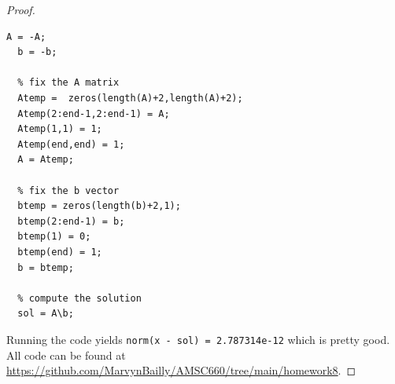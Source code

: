 \documentclass[12pt]{report}
\begin{document}
\begin{problem}
\begin{proof}
\begin{lstlisting}[style=Matlab-editor]
  A = -A;
  b = -b;

  % fix the A matrix
  Atemp =  zeros(length(A)+2,length(A)+2);
  Atemp(2:end-1,2:end-1) = A;
  Atemp(1,1) = 1;
  Atemp(end,end) = 1;
  A = Atemp;

  % fix the b vector
  btemp = zeros(length(b)+2,1);
  btemp(2:end-1) = b;
  btemp(1) = 0;
  btemp(end) = 1;
  b = btemp; 

  % compute the solution
  sol = A\b;
\end{lstlisting}
Running the code yields \verb+norm(x - sol) = 2.787314e-12+ which is pretty good. All code can be found at \url{https://github.com/MarvynBailly/AMSC660/tree/main/homework8}.

\end{proof}
\end{problem}




\end{document}
